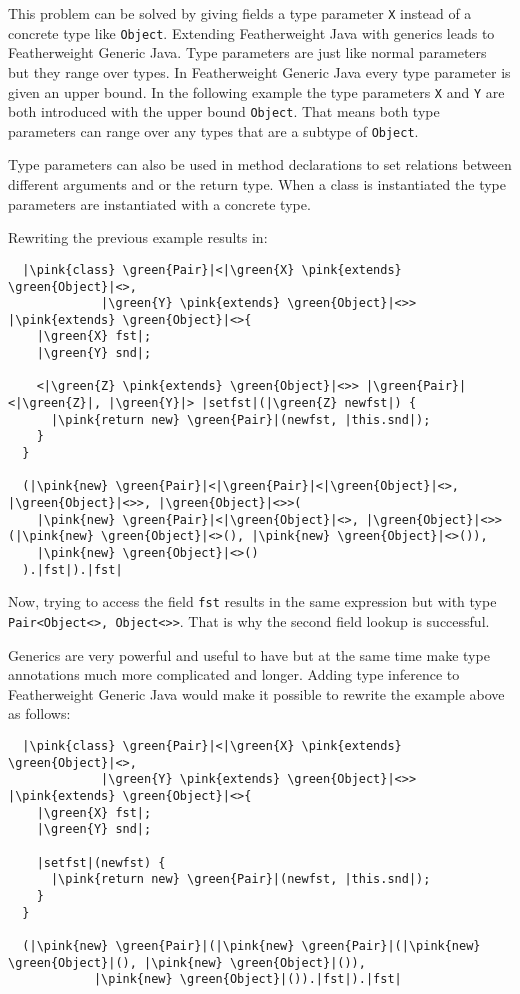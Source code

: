 This problem can be solved by giving fields a type parameter \verb|X| instead of a concrete type like \verb|Object|.
Extending Featherweight Java with generics leads to Featherweight Generic Java.
Type parameters are just like normal parameters but they range over types. In Featherweight Generic Java every type parameter is given an upper bound.
In the following example the type parameters \verb|X| and \verb|Y| are both introduced with the upper bound \verb|Object|.
That means both type parameters can range over any types that are a subtype of \verb|Object|.

Type parameters can also be used in method declarations to set relations between different arguments and or the return type.
When a class is instantiated the type parameters are instantiated with a concrete type.

Rewriting the previous example results in:

\begin{verbatim}
  |\pink{class} \green{Pair}|<|\green{X} \pink{extends} \green{Object}|<>,
             |\green{Y} \pink{extends} \green{Object}|<>> |\pink{extends} \green{Object}|<>{
    |\green{X} fst|;
    |\green{Y} snd|;

    <|\green{Z} \pink{extends} \green{Object}|<>> |\green{Pair}|<|\green{Z}|, |\green{Y}|> |setfst|(|\green{Z} newfst|) {
      |\pink{return new} \green{Pair}|(newfst, |this.snd|);
    }
  }

  (|\pink{new} \green{Pair}|<|\green{Pair}|<|\green{Object}|<>, |\green{Object}|<>>, |\green{Object}|<>>(
    |\pink{new} \green{Pair}|<|\green{Object}|<>, |\green{Object}|<>>(|\pink{new} \green{Object}|<>(), |\pink{new} \green{Object}|<>()),
    |\pink{new} \green{Object}|<>()
  ).|fst|).|fst|
\end{verbatim}

Now, trying to access the field \verb|fst| results in the same expression but with type \verb|Pair<Object<>, Object<>>|. That is why the second field lookup is successful.

Generics are very powerful and useful to have but at the same time make type annotations much more complicated and longer.
Adding type inference to Featherweight Generic Java would make it possible to rewrite the example above as follows:

\begin{verbatim}
  |\pink{class} \green{Pair}|<|\green{X} \pink{extends} \green{Object}|<>,
             |\green{Y} \pink{extends} \green{Object}|<>> |\pink{extends} \green{Object}|<>{
    |\green{X} fst|;
    |\green{Y} snd|;

    |setfst|(newfst) {
      |\pink{return new} \green{Pair}|(newfst, |this.snd|);
    }
  }

  (|\pink{new} \green{Pair}|(|\pink{new} \green{Pair}|(|\pink{new} \green{Object}|(), |\pink{new} \green{Object}|()),
            |\pink{new} \green{Object}|()).|fst|).|fst|
\end{verbatim}

